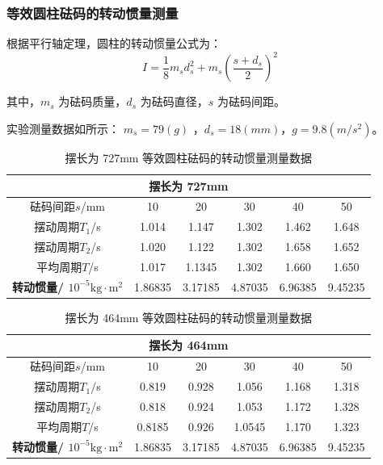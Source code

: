 \documentclass{article}
\begin{document}
\subsubsection{等效圆柱砝码的转动惯量测量}

根据平行轴定理，圆柱的转动惯量公式为：
$$
I = \frac{1}{8} m_s d_s^2 + m_s \left(\frac{s + d_s}{2}\right)^2
$$


其中，$m_s$ 为砝码质量，$d_s$ 为砝码直径，$s$ 为砝码间距。

实验测量数据如所示：
$m_s=79(g)$
，$d_s=18(mm)$，$g=9.8(m/s^2)$。


\begin{table}[h!]
    \centering
    \renewcommand{\arraystretch}{1.5}
    \setlength{\tabcolsep}{8pt}
    \begin{tabular}{|c|c|c|c|c|c|}
    \hline
    \multicolumn{6}{|c|}{\textbf{摆长为 727mm}} \\ \hline
    砝码间距$s$/mm & 10 & 20 & 30 & 40 & 50 \\ \hline
    摆动周期$T_1$/s & 1.014 & 1.147 & 1.302 & 1.462 & 1.648 \\ \hline
    摆动周期$T_2$/s & 1.020 & 1.122 & 1.302 & 1.658 & 1.652 \\ \hline
    平均周期$T$/s & 1.017 & 1.1345 & 1.302 & 1.660 & 1.650 \\ \hline
    \textbf{转动惯量/ $ \mathrm{10^{-5}kg \cdot m^2} $} & 1.86835 & 3.17185 & 4.87035 & 6.96385 & 9.45235 \\ \hline
    \end{tabular}
    \caption{摆长为 727mm 等效圆柱砝码的转动惯量测量数据}
    \label{tab:raw_data_simplified}
\end{table}



\begin{table}[h!]
    \centering
    \renewcommand{\arraystretch}{1.5}
    \setlength{\tabcolsep}{8pt}
    \begin{tabular}{|c|c|c|c|c|c|}
    \hline
    \multicolumn{6}{|c|}{\textbf{摆长为 464mm}} \\ \hline
    砝码间距$s$/mm & 10 & 20 & 30 & 40 & 50 \\ \hline
    摆动周期$T_1$/s & 0.819 & 0.928 & 1.056 & 1.168 & 1.318 \\ \hline
    摆动周期$T_2$/s & 0.818 & 0.924 & 1.053 & 1.172 & 1.328 \\ \hline
    平均周期$T$/s & 0.8185 & 0.926 & 1.0545 & 1.170 & 1.323 \\ \hline
    \textbf{转动惯量/ $ \mathrm{10^{-5}kg \cdot m^2} $} & 1.86835 & 3.17185 & 4.87035 & 6.96385 & 9.45235 \\ \hline
    \end{tabular}
    \caption{摆长为 464mm 等效圆柱砝码的转动惯量测量数据}
    \label{tab:raw_data_simplified}
\end{table}
\end{document}
